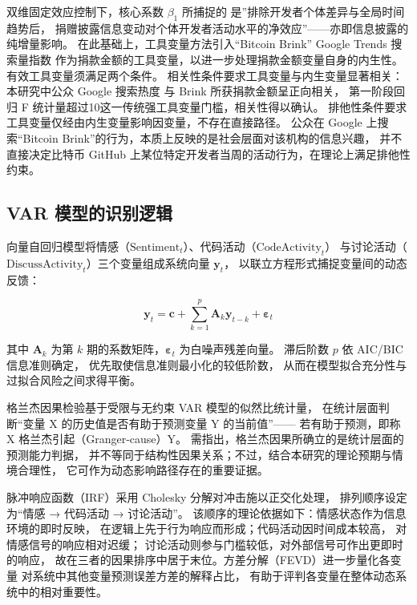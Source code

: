 双维固定效应控制下，核心系数 $\beta_1$ 所捕捉的
是”排除开发者个体差异与全局时间趋势后，
捐赠披露信息变动对个体开发者活动水平的净效应”——亦即信息披露的纯增量影响。
在此基础上，工具变量方法引入“Bitcoin Brink” Google Trends 搜索量指数
作为捐款金额的工具变量，以进一步处理捐款金额变量自身的内生性。
有效工具变量须满足两个条件。
相关性条件要求工具变量与内生变量显著相关：本研究中公众 Google 搜索热度
与 Brink 所获捐款金额呈正向相关，
第一阶段回归 F 统计量超过10这一传统强工具变量门槛，相关性得以确认。
排他性条件要求工具变量仅经由内生变量影响因变量，不存在直接路径。
公众在 Google 上搜索“Bitcoin Brink”的行为，本质上反映的是社会层面对该机构的信息兴趣，
并不直接决定比特币 GitHub 上某位特定开发者当周的活动行为，在理论上满足排他性约束。

\subsection{VAR 模型的识别逻辑}

向量自回归模型将情感（$\text{Sentiment}_t$）、代码活动（$\text{CodeActivity}_t$）
与讨论活动（$\text{DiscussActivity}_t$）三个变量组成系统向量 $\mathbf{y}_t$，
以联立方程形式捕捉变量间的动态反馈：

\begin{equation}
\label{eq:var-overview}
\mathbf{y}_t = \mathbf{c} + \sum_{k=1}^{p} \mathbf{A}_k \mathbf{y}_{t-k} + \boldsymbol{\varepsilon}_t
\end{equation}

其中 $\mathbf{A}_k$ 为第 $k$ 期的系数矩阵，$\boldsymbol{\varepsilon}_t$ 为白噪声残差向量。
滞后阶数 $p$ 依 AIC/BIC 信息准则确定，
优先取使信息准则最小化的较低阶数，
从而在模型拟合充分性与过拟合风险之间求得平衡。

格兰杰因果检验基于受限与无约束 VAR 模型的似然比统计量，
在统计层面判断“变量 X 的历史值是否有助于预测变量 Y 的当前值”——
若有助于预测，即称 X 格兰杰引起（Granger-cause）Y。
需指出，格兰杰因果所确立的是统计层面的预测能力判据，
并不等同于结构性因果关系；不过，结合本研究的理论预期与情境合理性，
它可作为动态影响路径存在的重要证据。

脉冲响应函数（IRF）采用 Cholesky 分解对冲击施以正交化处理，
排列顺序设定为“情感 → 代码活动 → 讨论活动”。
该顺序的理论依据如下：情感状态作为信息环境的即时反映，
在逻辑上先于行为响应而形成；代码活动因时间成本较高，
对情感信号的响应相对迟缓；
讨论活动则参与门槛较低，对外部信号可作出更即时的响应，
故在三者的因果排序中居于末位。方差分解（FEVD）进一步量化各变量
对系统中其他变量预测误差方差的解释占比，
有助于评判各变量在整体动态系统中的相对重要性。

